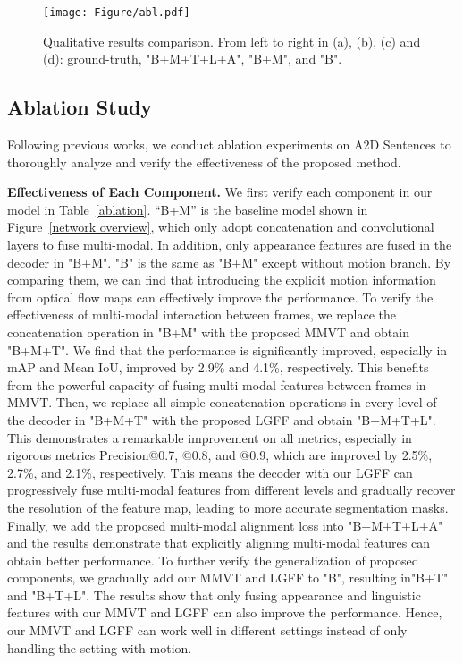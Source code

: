 \documentclass[10pt,twocolumn,letterpaper]{article}
\begin{document}
\begin{figure*}[!t]
  \centering
  \texttt{[image: Figure/abl.pdf]}
  \caption{Qualitative results comparison.  From left to right in (a), (b), (c) and (d): ground-truth, "B+M+T+L+A", "B+M", and "B".}
  \label{abl_figure}
  \vspace{-6mm}
\end{figure*}

\vspace{-1mm}
\subsection{Ablation Study} \label{albation study}
\vspace{-1mm}
Following previous works, we conduct ablation experiments on A2D Sentences to thoroughly analyze and verify the effectiveness of the proposed method. 

\vspace{-1mm}
\noindent\textbf{Effectiveness of Each Component.} We first verify each component in our model in Table~\ref{ablation}.  “B+M” is the baseline model shown in Figure~\ref{network overview}, which only adopt concatenation and convolutional layers to fuse multi-modal. In addition, only appearance features are fused in the decoder in "B+M". "B" is the same as "B+M" except without motion branch. By comparing them, we can find that introducing the explicit motion information from optical flow maps can effectively improve the performance. To verify the effectiveness of multi-modal interaction between frames, we replace the concatenation operation in "B+M" with the proposed MMVT and obtain "B+M+T". We find that the performance is significantly improved, especially in mAP and Mean IoU, improved by 2.9\% and 4.1\%, respectively. This benefits from the powerful capacity of fusing multi-modal features between frames in MMVT. Then, we replace all simple concatenation operations in every level of the decoder in "B+M+T" with the proposed LGFF and obtain "B+M+T+L". This demonstrates a remarkable improvement on all metrics, especially in rigorous metrics Precision@0.7, @0.8, and @0.9, which are improved by 2.5\%, 2.7\%, and 2.1\%, respectively. This means the decoder with our LGFF can progressively fuse multi-modal features from different levels and gradually recover the resolution of the feature map, leading to more accurate segmentation masks. Finally, we add the proposed multi-modal alignment loss into "B+M+T+L+A" and the results demonstrate that explicitly aligning multi-modal features can obtain better performance. To further verify the generalization of proposed components, we gradually add our MMVT and LGFF to "B",  resulting in"B+T" and "B+T+L". The results show that only fusing appearance and linguistic features with our MMVT and LGFF can also improve the performance. Hence, our MMVT and LGFF can work well in different settings instead of only handling the setting with motion. 
\end{document}
